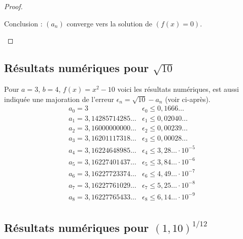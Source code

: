 \documentclass[class=report,crop=false]{standalone}
\begin{document}
\begin{proof}
\begin{enumerate}
  Conclusion : $(a_n)$ converge vers la solution de $(f(x)=0)$.

\end{enumerate}



\bigskip



\end{proof}

\subsection{Résultats numériques pour $\sqrt{10}$}

Pour $a=3$, $b=4$, $f(x)=x^2-10$ voici les résultats numériques, est aussi indiquée
une majoration de l'erreur $\epsilon_n = \sqrt{10}-a_n$ (voir ci-après).
$$
\begin{array}{l|l}
  a_0 = 3                          & \epsilon_0 \le 0,1666\ldots \\
  a_1 = 3,14285714285\ldots    & \epsilon_1 \le 0,02040\ldots \\
  a_2 = 3,16000000000\ldots    & \epsilon_2 \le 0,00239\ldots \\
  a_3 = 3,16201117318\ldots   & \epsilon_3 \le 0,00028\ldots \\
  a_4 = 3,16224648985\ldots   & \epsilon_4 \le 3,28\ldots \cdot 10^{-5} \\
  a_5 = 3,16227401437\ldots    & \epsilon_5 \le 3,84\ldots \cdot 10^{-6}\\
  a_6 = 3,16227723374\ldots    & \epsilon_6 \le 4,49\ldots \cdot 10^{-7} \\
  a_7 = 3,16227761029\ldots   & \epsilon_7 \le 5,25\ldots \cdot 10^{-8} \\
  a_8 = 3,16227765433\ldots   & \epsilon_8 \le 6,14\ldots \cdot 10^{-9} \\
\end{array}
$$

\subsection{Résultats numériques pour $(1,10)^{1/12}$}
\end{document}
